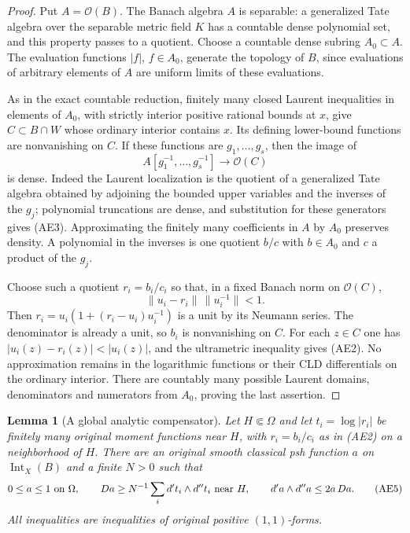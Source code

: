 \documentclass[11pt,a4paper]{article}
\numberwithin{equation}{section}
\newtheorem{lemma}[theorem]{Lemma}
\theoremstyle{definition}
\theoremstyle{remark}
\begin{document}
\begin{proof}
Put $A=\mathcal O(B)$.  The Banach algebra $A$ is separable:
a generalized Tate algebra over the separable metric field $K$
has a countable dense polynomial set, and this property passes
to a quotient.  Choose a countable dense subring $A_0\subset A$.
The evaluation functions $|f|$, $f\in A_0$, generate the topology
of $B$, since evaluations of arbitrary elements of $A$ are
uniform limits of these evaluations.

As in the exact countable reduction, finitely many closed Laurent
inequalities in elements of $A_0$, with strictly interior positive
rational bounds at $x$, give $C\subset B\cap W$ whose ordinary
interior contains $x$.  Its defining lower-bound functions are
nonvanishing on $C$.  If these functions are $g_1,\ldots,g_s$,
then the image of
\[
                       A[g_1^{-1},\ldots,g_s^{-1}]
                           \longrightarrow\mathcal O(C)
 \tag{AE3}
\]
is dense.  Indeed the Laurent localization is the quotient of a
generalized Tate algebra obtained by adjoining the bounded upper
variables and the inverses of the $g_j$; polynomial truncations
are dense, and substitution for these generators gives (AE3).
Approximating the finitely many coefficients in $A$ by $A_0$
preserves density.  A polynomial in the inverses is one quotient
$b/c$ with $b\in A_0$ and $c$ a product of the $g_j$.

Choose such a quotient $r_i=b_i/c_i$ so that, in a fixed Banach
norm on $\mathcal O(C)$,
\[
                     \|u_i-r_i\|\,\|u_i^{-1}\|<1.
 \tag{AE4}
\]
Then $r_i=u_i(1+(r_i-u_i)u_i^{-1})$ is a unit by its Neumann
series.  The denominator is already a unit, so $b_i$ is
nonvanishing on $C$.  For each $z\in C$ one has
$|u_i(z)-r_i(z)|<|u_i(z)|$, and the ultrametric inequality
gives (AE2).  No approximation remains in the logarithmic
functions or their CLD differentials on the ordinary interior.
There are countably many possible Laurent domains, denominators
and numerators from $A_0$, proving the last assertion.
\end{proof}

\begin{lemma}[A global analytic compensator]
\label{lem:r11-affinoid-compensator}
Let $H\Subset\Omega$ and let $t_i=\log|r_i|$ be finitely many
original moment functions near $H$, with
$r_i=b_i/c_i$ as in (AE2) on a neighborhood of $H$.
There are an original smooth classical psh function $a$ on
$\operatorname{Int}_X(B)$ and a finite $N>0$ such that
\[
 0\leq a\leq1\ \hbox{on }\Omega,\qquad
 Da\geq N^{-1}\sum_i d't_i\wedge d''t_i\ \hbox{near }H,
 \qquad d'a\wedge d''a\leq2a\,Da .
 \tag{AE5}
\]
All inequalities are inequalities of original positive $(1,1)$-forms.
\end{lemma}
\end{document}
